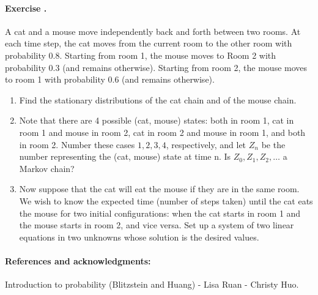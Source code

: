 \documentclass[12pt,a4paper]{article}
\newcounter{num}  %
\begin{document}
	\paragraph{Exercise \thenum.}
	A cat and a mouse move independently back and forth between two rooms. At each
	time step, the cat moves from the current room to the other room with probability 0.8.
	Starting from room 1, the mouse moves to Room 2 with probability 0.3 (and remains
	otherwise). Starting from room 2, the mouse moves to room 1 with probability 0.6 (and
	remains otherwise).
	\begin{enumerate}
		\item Find the stationary distributions of the cat chain and of the mouse chain.
		\item Note that there are 4 possible (cat, mouse) states: both in room 1, cat in room
		1 and mouse in room 2, cat in room 2 and mouse in room 1, and both in room 2.
		Number these cases $1, 2, 3, 4$, respectively, and let $Z_n$ be the number representing the
		(cat, mouse) state at time n. Is $Z_0, Z_1, Z_2,\ldots$ a Markov chain?
		\item Now suppose that the cat will eat the mouse if they are in the same room. 
		We wish to know the expected time (number of steps taken) until the cat eats the mouse for two initial configurations: when the cat starts in room 1 and the mouse starts in room 2, and vice versa. 
		Set up a system of two linear equations in two unknowns whose solution is the desired values.
	\end{enumerate}
	\paragraph{References and acknowledgments:} Introduction to probability (Blitzstein and Huang) - Lisa Ruan - Christy Huo.
	
\end{document}
